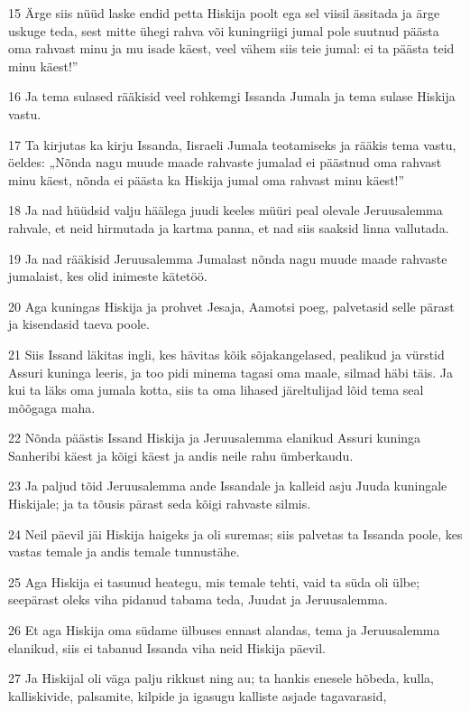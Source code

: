 \par 15 Ärge siis nüüd laske endid petta Hiskija poolt ega sel viisil ässitada ja ärge uskuge teda, sest mitte ühegi rahva või kuningriigi jumal pole suutnud päästa oma rahvast minu ja mu isade käest, veel vähem siis teie jumal: ei ta päästa teid minu käest!”
\par 16 Ja tema sulased rääkisid veel rohkemgi Issanda Jumala ja tema sulase Hiskija vastu.
\par 17 Ta kirjutas ka kirju Issanda, Iisraeli Jumala teotamiseks ja rääkis tema vastu, öeldes: „Nõnda nagu muude maade rahvaste jumalad ei päästnud oma rahvast minu käest, nõnda ei päästa ka Hiskija jumal oma rahvast minu käest!”
\par 18 Ja nad hüüdsid valju häälega juudi keeles müüri peal olevale Jeruusalemma rahvale, et neid hirmutada ja kartma panna, et nad siis saaksid linna vallutada.
\par 19 Ja nad rääkisid Jeruusalemma Jumalast nõnda nagu muude maade rahvaste jumalaist, kes olid inimeste kätetöö.
\par 20 Aga kuningas Hiskija ja prohvet Jesaja, Aamotsi poeg, palvetasid selle pärast ja kisendasid taeva poole.
\par 21 Siis Issand läkitas ingli, kes hävitas kõik sõjakangelased, pealikud ja vürstid Assuri kuninga leeris, ja too pidi minema tagasi oma maale, silmad häbi täis. Ja kui ta läks oma jumala kotta, siis ta oma lihased järeltulijad lõid tema seal mõõgaga maha.
\par 22 Nõnda päästis Issand Hiskija ja Jeruusalemma elanikud Assuri kuninga Sanheribi käest ja kõigi käest ja andis neile rahu ümberkaudu.
\par 23 Ja paljud tõid Jeruusalemma ande Issandale ja kalleid asju Juuda kuningale Hiskijale; ja ta tõusis pärast seda kõigi rahvaste silmis.
\par 24 Neil päevil jäi Hiskija haigeks ja oli suremas; siis palvetas ta Issanda poole, kes vastas temale ja andis temale tunnustähe.
\par 25 Aga Hiskija ei tasunud heategu, mis temale tehti, vaid ta süda oli ülbe; seepärast oleks viha pidanud tabama teda, Juudat ja Jeruusalemma.
\par 26 Et aga Hiskija oma südame ülbuses ennast alandas, tema ja Jeruusalemma elanikud, siis ei tabanud Issanda viha neid Hiskija päevil.
\par 27 Ja Hiskijal oli väga palju rikkust ning au; ta hankis enesele hõbeda, kulla, kalliskivide, palsamite, kilpide ja igasugu kalliste asjade tagavarasid,
